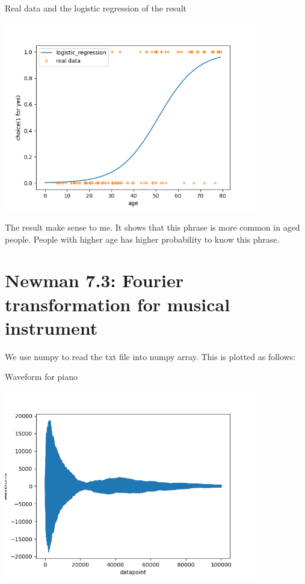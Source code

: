 \documentclass[letterpaper,12pt]{article}
\begin{document}
\begin{table}[!h]
    \centering
    \caption{Real data and the logistic regression of the result}
    \includegraphics[width=11cm]{8-1-1.png}
\end{table}%
\newpage

The result make sense to me. It shows that this phrase is more common in aged people. People with higher age has higher probability to know this phrase.

\section{Newman 7.3: Fourier transformation for musical instrument}

We use numpy to read the txt file into numpy array. This is plotted as follows:

\begin{table}[!h]
    \centering
    \caption{Waveform for piano}
    \includegraphics[width=11cm]{8-2-1.png}
\end{table}%
\end{document}
